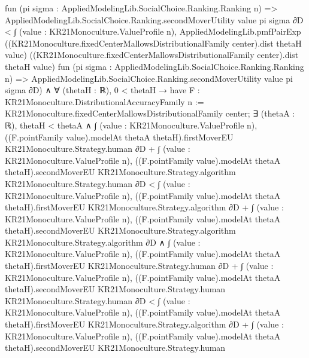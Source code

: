 \documentclass[10pt]{article}
\begin{document}
\begin{ReviewVerbatim}
                    fun (pi sigma : AppliedModelingLib.SocialChoice.Ranking.Ranking n) =>
                    AppliedModelingLib.SocialChoice.Ranking.secondMoverUtility value pi sigma ∂D <
                ∫ (value : KR21Monoculture.ValueProfile n),
                  AppliedModelingLib.pmfPairExp
                    ((KR21Monoculture.fixedCenterMallowsDistributionalFamily center).dist thetaH value)
                    ((KR21Monoculture.fixedCenterMallowsDistributionalFamily center).dist thetaH value)
                    fun (pi sigma : AppliedModelingLib.SocialChoice.Ranking.Ranking n) =>
                    AppliedModelingLib.SocialChoice.Ranking.secondMoverUtility value pi sigma ∂D) ∧
        ∀ (thetaH : ℝ),
          0 < thetaH →
            have F : KR21Monoculture.DistributionalAccuracyFamily n :=
              KR21Monoculture.fixedCenterMallowsDistributionalFamily center;
            ∃ (thetaA : ℝ),
              thetaH < thetaA ∧
                ∫ (value : KR21Monoculture.ValueProfile n),
                        ((F.pointFamily value).modelAt thetaA thetaH).firstMoverEU KR21Monoculture.Strategy.human ∂D +
                      ∫ (value : KR21Monoculture.ValueProfile n),
                        ((F.pointFamily value).modelAt thetaA thetaH).secondMoverEU KR21Monoculture.Strategy.algorithm
                          KR21Monoculture.Strategy.human ∂D <
                    ∫ (value : KR21Monoculture.ValueProfile n),
                        ((F.pointFamily value).modelAt thetaA thetaH).firstMoverEU
                          KR21Monoculture.Strategy.algorithm ∂D +
                      ∫ (value : KR21Monoculture.ValueProfile n),
                        ((F.pointFamily value).modelAt thetaA thetaH).secondMoverEU KR21Monoculture.Strategy.algorithm
                          KR21Monoculture.Strategy.algorithm ∂D ∧
                  ∫ (value : KR21Monoculture.ValueProfile n),
                          ((F.pointFamily value).modelAt thetaA thetaH).firstMoverEU KR21Monoculture.Strategy.human ∂D +
                        ∫ (value : KR21Monoculture.ValueProfile n),
                          ((F.pointFamily value).modelAt thetaA thetaH).secondMoverEU KR21Monoculture.Strategy.human
                            KR21Monoculture.Strategy.human ∂D <
                      ∫ (value : KR21Monoculture.ValueProfile n),
                          ((F.pointFamily value).modelAt thetaA thetaH).firstMoverEU
                            KR21Monoculture.Strategy.algorithm ∂D +
                        ∫ (value : KR21Monoculture.ValueProfile n),
                          ((F.pointFamily value).modelAt thetaA thetaH).secondMoverEU KR21Monoculture.Strategy.human

\end{ReviewVerbatim}
\end{document}
